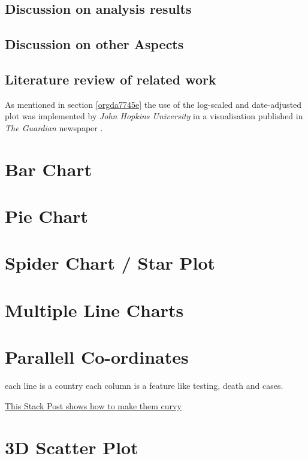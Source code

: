\documentclass[11pt]{article}
\begin{document}
\subsection{Discussion on analysis results}
\label{sec:org32481c2}
\subsection{Discussion on other Aspects}
\label{sec:org5cd481d}
\subsection{Literature review of related work}
\label{sec:orgdb93e1d}
As mentioned in section \ref{orgda7745e} the use of the log-scaled and date-adjusted plot was implemented by \emph{John Hopkins University} in a visualisation published in \emph{The Guardian} newspaper \cite{gutierrez2020}.



\section{Bar Chart}
\label{sec:org574a540}

\section{Pie Chart}
\label{sec:org7a659d1}

\section{Spider Chart / Star Plot}
\label{sec:org1cd00da}

\section{Multiple Line Charts}
\label{sec:org086c831}

\section{Parallell Co-ordinates}
\label{sec:org246372d}
each line is a country
each column is a feature like testing, death and cases.

\href{https://stackoverflow.com/a/35206832/10593632}{This Stack Post shows how to make them curvy}

\section{3D Scatter Plot}
\label{sec:orgef591b1}
\end{document}
